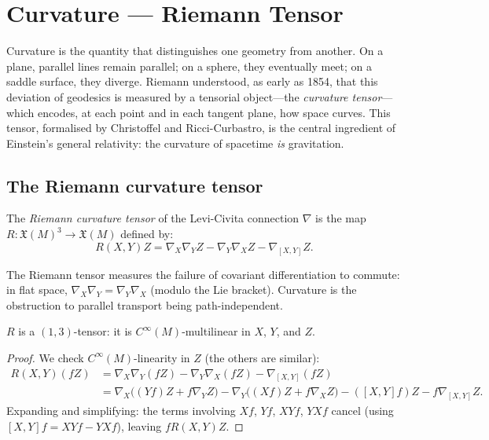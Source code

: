 \chapter{Curvature --- Riemann Tensor}
\label{ch:curvature}

Curvature is the quantity that distinguishes one geometry from another. On a plane, parallel lines remain parallel; on a sphere, they eventually meet; on a saddle surface, they diverge. Riemann understood, as early as 1854, that this deviation of geodesics is measured by a tensorial object---the \emph{curvature tensor}---which encodes, at each point and in each tangent plane, how space curves. This tensor, formalised by Christoffel and Ricci-Curbastro, is the central ingredient of Einstein's general relativity: the curvature of spacetime \emph{is} gravitation.

\section{The Riemann curvature tensor}

\begin{definition}
The \emph{Riemann curvature tensor} of the Levi-Civita connection $\nabla$ is
the map $R : \mathfrak{X}(M)^3 \to \mathfrak{X}(M)$ defined by:
\[
    R(X,Y)Z = \nabla_X \nabla_Y Z - \nabla_Y \nabla_X Z - \nabla_{[X,Y]} Z.
\]
\end{definition}

\begin{intuition}[title=\textbf{Curvature measures non-commutativity}]
The Riemann tensor measures the failure of covariant differentiation to commute:
in flat space, $\nabla_X \nabla_Y = \nabla_Y \nabla_X$ (modulo the Lie bracket).
Curvature is the obstruction to parallel transport being path-independent.
\end{intuition}

\begin{proposition}
$R$ is a $(1,3)$-tensor: it is $C^\infty(M)$-multilinear in $X$, $Y$, and $Z$.
\end{proposition}

\begin{proof}
We check $C^\infty(M)$-linearity in $Z$ (the others are similar):
\begin{align*}
    R(X,Y)(fZ) &= \nabla_X\nabla_Y(fZ) - \nabla_Y\nabla_X(fZ) - \nabla_{[X,Y]}(fZ) \\
    &= \nabla_X\big((Yf)Z + f\nabla_Y Z\big) - \nabla_Y\big((Xf)Z + f\nabla_X Z\big)
    - ([X,Y]f)Z - f\nabla_{[X,Y]}Z.
\end{align*}
Expanding and simplifying: the terms involving $Xf$, $Yf$, $XYf$, $YXf$ cancel
(using $[X,Y]f = XYf - YXf$), leaving $fR(X,Y)Z$.
\end{proof}

